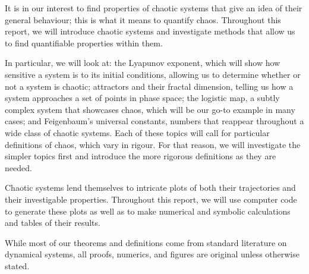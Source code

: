 It is in our interest to find properties of chaotic systems that give an idea of their general behaviour; this is what it means to quantify chaos. Throughout this report, we will introduce chaotic systems and investigate methods that allow us to find quantifiable properties within them. 

In particular, we will look at: the Lyapunov exponent, which will show how sensitive a system is to its initial conditions, allowing us to determine whether or not a system is chaotic; attractors and their fractal dimension, telling us how a system approaches a set of points in phase space; the logistic map, a subtly complex system that showcases chaos, which will be our go-to example in many cases; and Feigenbaum's universal constants, numbers that reappear throughout a wide class of chaotic systems. Each of these topics will call for particular definitions of chaos, which vary in rigour. For that reason, we will investigate the simpler topics first and introduce the more rigorous definitions as they are needed.

Chaotic systems lend themselves to intricate plots of both their trajectories and their investigable properties. Throughout this report, we will use computer code to generate these plots as well as to make numerical and symbolic calculations and tables of their results. 

While most of our theorems and definitions come from standard literature on dynamical systems, all proofs, numerics, and figures are original unless otherwise stated.